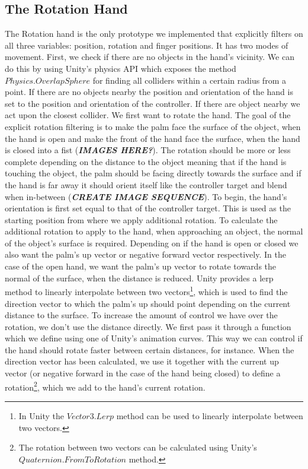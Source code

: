 \subsection{The Rotation Hand}
\label{subsec:rotationHand}
The Rotation hand is the only prototype we implemented that explicitly filters on all three variables: position, rotation and finger positions. It has two modes of movement. First, we check if there are no objects in the hand's vicinity. We can do this by using Unity's physics API which exposes the method $Physics.OverlapSphere$ for finding all colliders within a certain radius from a point. If there are no objects nearby the position and orientation of the hand is set to the position and orientation of the controller. If there are object nearby we act upon the closest collider. We first want to rotate the hand. The goal of the explicit rotation filtering is to make the palm face the surface of the object, when the hand is open and make the front of the hand face the surface, when the hand is closed into a fist (\textbf{\textit{IMAGES HERE?}}). The rotation should be more or less complete depending on the distance to the object meaning that if the hand is touching the object, the palm should be facing directly towards the surface and if the hand is far away it should orient itself like the controller target and blend when in-between (\textbf{\textit{CREATE IMAGE SEQUENCE}}). To begin, the hand's orientation is first set equal to that of the controller target. This is used as the starting position from where we apply additional rotation. To calculate the additional rotation to apply to the hand, when approaching an object, the normal of the object's surface is required. Depending on if the hand is open or closed we also want the palm's up vector or negative forward vector respectively. In the case of the open hand, we want the palm's up vector to rotate towards the normal of the surface, when the distance is reduced. Unity provides a lerp method to linearly interpolate between two vectors\footnote{In Unity the $Vector3.Lerp$ method can be used to linearly interpolate between two vectors.}, which is used to find the direction vector to which the palm's up should point depending on the current distance to the surface. To increase the amount of control we have over the rotation, we don't use the distance directly. We first pass it through a function which we define using one of Unity's animation curves. This way we can control if the hand should rotate faster between certain distances, for instance. When the direction vector has been calculated, we use it together with the current up vector (or negative forward in the case of the hand being closed) to define a rotation\footnote{The rotation between two vectors can be calculated using Unity's $Quaternion.FromToRotation$ method.}, which we add to the hand's current rotation.

